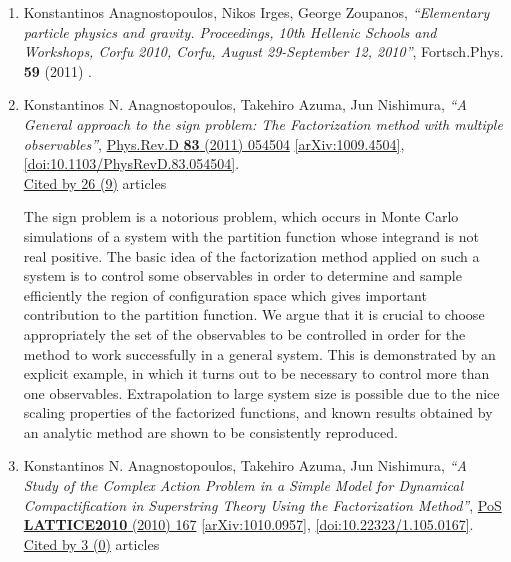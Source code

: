 \documentclass[a4paper,10pt]{article}
\begin{document}
\begin{enumerate}
\item Konstantinos Anagnostopoulos, Nikos Irges, George Zoupanos, {\it ``Elementary particle physics and gravity. Proceedings, 10th Hellenic Schools and Workshops, Corfu 2010, Corfu, August 29-September 12, 2010''}, Fortsch.Phys. {\bf 59} (2011) .


\item Konstantinos N. Anagnostopoulos, Takehiro Azuma, Jun Nishimura, {\it ``A General approach to the sign problem: The Factorization method with multiple observables''}, \href{https://www.doi.org/10.1103/PhysRevD.83.054504}{Phys.Rev.D {\bf 83} (2011) 054504} \href{https://arxiv.org/abs/1009.4504}{[arXiv:1009.4504]}, \href{https://www.doi.org/10.1103/PhysRevD.83.054504}{[doi:10.1103/PhysRevD.83.054504]}.
\\\href{https://inspirehep.net/literature/?q=refersto%3Arecid%3A870877}{Cited by 26 (9)} articles

The sign problem is a notorious problem, which occurs in Monte Carlo simulations of a system with the partition function whose integrand is not real positive. The basic idea of the factorization method applied on such a system is to control some observables in order to determine and sample efficiently the region of configuration space which gives important contribution to the partition function. We argue that it is crucial to choose appropriately the set of the observables to be controlled in order for the method to work successfully in a general system. This is demonstrated by an explicit example, in which it turns out to be necessary to control more than one observables. Extrapolation to large system size is possible due to the nice scaling properties of the factorized functions, and known results obtained by an analytic method are shown to be consistently reproduced.
\item Konstantinos N. Anagnostopoulos, Takehiro Azuma, Jun Nishimura, {\it ``A Study of the Complex Action Problem in a Simple Model for Dynamical Compactification in Superstring Theory Using the Factorization Method''}, \href{https://www.doi.org/10.22323/1.105.0167}{PoS {\bf LATTICE2010} (2010) 167} \href{https://arxiv.org/abs/1010.0957}{[arXiv:1010.0957]}, \href{https://www.doi.org/10.22323/1.105.0167}{[doi:10.22323/1.105.0167]}.
\\\href{https://inspirehep.net/literature/?q=refersto%3Arecid%3A871968}{Cited by 3 (0)} articles


\end{enumerate}
\end{document}
